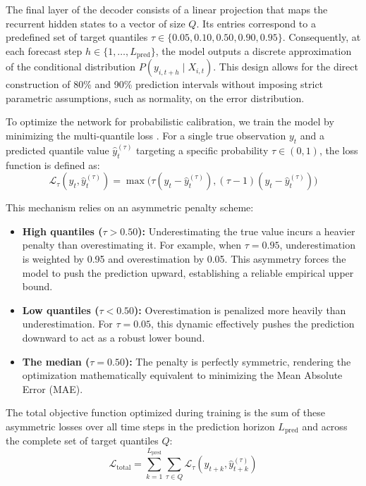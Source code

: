 \documentclass[12pt]{article}
\begin{document}
The final layer of the decoder consists of a linear projection that maps the recurrent hidden states to a vector of size $Q$. Its entries correspond to a predefined set of target quantiles $\tau \in \{0.05,\allowbreak 0.10,\allowbreak 0.50,\allowbreak 0.90,\allowbreak 0.95\}$. Consequently, at each forecast step $h \in \{1, \dots, L_{\text{pred}}\}$, the model outputs a discrete approximation of the conditional distribution $P(y_{i,t+h} \mid X_{i,t})$. This design allows for the direct construction of 80\% and 90\% prediction intervals without imposing strict parametric assumptions, such as normality, on the error distribution. 

To optimize the network for probabilistic calibration, we train the model by minimizing the multi-quantile loss \citep{koenker1978regression}. For a single true observation $y_t$ and a predicted quantile value $\hat{y}_t^{(\tau)}$ targeting a specific probability $\tau \in (0,1)$, the loss function is defined as:
\begin{equation}
    \mathcal{L}_\tau(y_t, \hat{y}_t^{(\tau)}) = \max\Big(\tau(y_t - \hat{y}_t^{(\tau)}), (\tau - 1)(y_t - \hat{y}_t^{(\tau)})\Big)
\end{equation}

This mechanism relies on an asymmetric penalty scheme:
\begin{itemize}
    \item \textbf{High quantiles ($\tau > 0.50$):} Underestimating the true value incurs a heavier penalty than overestimating it. For example, when $\tau = 0.95$, underestimation is weighted by 0.95 and overestimation by 0.05. This asymmetry forces the model to push the prediction upward, establishing a reliable empirical upper bound.
    \item \textbf{Low quantiles ($\tau < 0.50$):} Overestimation is penalized more heavily than underestimation. For $\tau = 0.05$, this dynamic effectively pushes the prediction downward to act as a robust lower bound.
    \item \textbf{The median ($\tau = 0.50$):} The penalty is perfectly symmetric, rendering the optimization mathematically equivalent to minimizing the Mean Absolute Error (MAE).
\end{itemize}

The total objective function optimized during training is the sum of these asymmetric losses over all time steps in the prediction horizon $L_{\text{pred}}$ and across the complete set of target quantiles $Q$:
\begin{equation}
    \mathcal{L}_{\text{total}} = \sum_{k=1}^{L_{\text{pred}}} \sum_{\tau \in Q} \mathcal{L}_\tau(y_{t+k}, \hat{y}_{t+k}^{(\tau)})
\end{equation}
\end{document}

